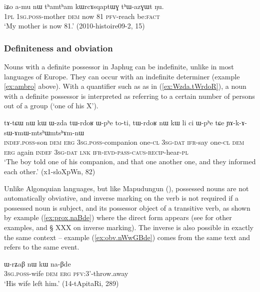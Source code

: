 \begin{exe}
\ex \label{ex:iZo.amu}
\gll iʑo a-mu nɯ tʰamtʰam kɯrcɤsqaptɯɣ tʰɯ-azɣɯt ŋu. \\
\textsc{1pl} \textsc{1sg.poss}-mother \textsc{dem} now 81 \textsc{pfv}-reach  be:\textsc{fact} \\
\glt `My mother is now 81.' (2010-histoire09-2, 15)
\end{exe}

\subsubsection{Definiteness and obviation}
Nouns with a definite possessor in Japhug can be indefinite, unlike in most languages of Europe. They can occur with an indefinite determiner (example \ref{ex:ambro}  above). With a quantifier such as  as in (\ref{ex:Wzda.tWrdoR}), a noun with a definite possessor is interpreted as referring to a certain number of persons out of a group (`one of his X').

 \begin{exe}
\ex \label{ex:Wzda.tWrdoR}
\gll tɤ-tɕɯ nɯ kɯ ɯ-zda tɯ-rdoʁ ɯ-pʰe to-ti, tɯ-rdoʁ nɯ kɯ li ci ɯ-pʰe tɕe ɲɤ-k-ɤ-sɯ-ɤmɯ-mtsʰɯ\redp{}mtsʰɤm-nɯ \\
\textsc{indef.poss}-son \textsc{dem} \textsc{erg} \textsc{3sg.poss}-companion one-\textsc{cl} \textsc{3sg-dat} \textsc{ifr}-say one-\textsc{cl}  \textsc{dem} \textsc{erg} again \textsc{indef} \textsc{3sg-dat} \textsc{lnk}   \textsc{ifr}-\textsc{evd}-\textsc{pass}-\textsc{caus}-\textsc{recip}-hear-\textsc{pl} \\
\glt `The boy told one of his companion, and that one another one, and they informed each other.' (x1-sloXpWn, 82)
\end{exe}

Unlike Algonquian languages, but like Mapudungun (\citealt{haude16symmetrical}), possessed nouns are not automatically obviative, and inverse marking on the verb is not required if a possessed noun is subject, and its possessor object of a transitive verb, as shown by example (\ref{ex:prox.naBde}) where the direct form  appears (see \citealt{jacques10inverse} for other examples, and § XXX on inverse marking). The inverse  is also possible in exactly the same context -- example  (\ref{ex:obv.nWwGBde}) comes from the same text and refers to the same event.

\begin{exe}
\ex \label{ex:prox.naBde}
\gll ɯ-rʑaβ nɯ kɯ na-βde \\
\textsc{3sg.poss}-wife \textsc{dem} \textsc{erg} \textsc{pfv}:3'-throw.away \\
\glt `His wife left him.' (14-tApitaRi, 289)
\end{exe}

